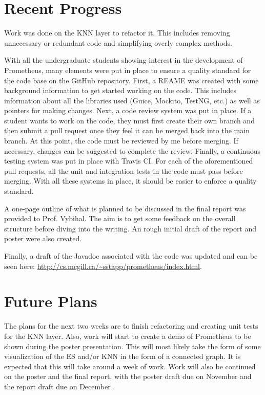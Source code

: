 \documentclass[]{article}
\begin{document}
	\section{Recent Progress} \label{sec:progress}
	
	Work was done on the KNN layer to refactor it. This includes removing unnecessary or redundant code and simplifying overly complex methods.
	
	With all the undergraduate students showing interest in the development of Prometheus, many elements were put in place to ensure a quality standard for the code base on the GitHub repository. First, a REAME was created with some background information to get started working on the code. This includes information about all the libraries used (Guice, Mockito, TestNG, etc.) as well as pointers for making changes. Next, a code review system was put in place. If a student wants to work on the code, they must first create their own branch and then submit a pull request once they feel it can be merged back into the main branch. At this point, the code must be reviewed by me before merging. If necessary, changes can be suggested to complete the review. Finally, a continuous testing system was put in place with Travis CI. For each of the aforementioned pull requests, all the unit and integration tests in the code must pass before merging. With all these systems in place, it should be easier to enforce a quality standard.
	
	A one-page outline of what is planned to be discussed in the final report was provided to Prof. Vybihal. The aim is to get some feedback on the overall structure before diving into the writing. An rough initial draft of the report and poster were also created.
	
	Finally, a draft of the Javadoc associated with the code was updated and can be seen here: \url{http://cs.mcgill.ca/~sstapp/prometheus/index.html}.
	
	
	\section{Future Plans} \label{sec:plans}
		
	The plans for the next two weeks are to finish refactoring and creating unit tests for the KNN layer. Also, work will start to create a demo of Prometheus to be shown during the poster presentation. This will most likely take the form of some visualization of the ES and/or KNN in the form of a connected graph. It is expected that this will take around a week of work. Work will also be continued on the poster and the final report, with the poster draft due on November  and the report draft due on December .
	
	
\end{document}
